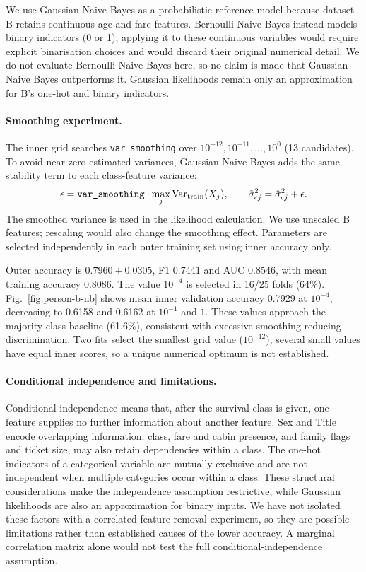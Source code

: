 \documentclass[10pt,twocolumn]{article}
\begin{document}
We use Gaussian Naive Bayes as a probabilistic reference model because dataset B retains continuous age and fare features.
Bernoulli Naive Bayes instead models binary indicators (0 or 1); applying it to these continuous variables would require explicit binarisation choices and would discard their original numerical detail.
We do not evaluate Bernoulli Naive Bayes here, so no claim is made that Gaussian Naive Bayes outperforms it.
Gaussian likelihoods remain only an approximation for B's one-hot and binary indicators.

\paragraph{Smoothing experiment.}
The inner grid searches \texttt{var\_smoothing} over $10^{-12},10^{-11},\ldots,10^0$ (13 candidates).
To avoid near-zero estimated variances, Gaussian Naive Bayes adds the same stability term to each class-feature variance:
\[
 \epsilon=\texttt{var\_smoothing}\cdot\max_j\operatorname{Var}_{\rm train}(X_j),
 \qquad \tilde\sigma_{cj}^{2}=\hat\sigma_{cj}^{2}+\epsilon.
\]
The smoothed variance is used in the likelihood calculation.
We use unscaled B features; rescaling would also change the smoothing effect.
Parameters are selected independently in each outer training set using inner accuracy only.

Outer accuracy is $0.7960\pm0.0305$, F1 0.7441 and AUC 0.8546, with mean training accuracy 0.8086.
The value $10^{-4}$ is selected in 16/25 folds (64\%).
Fig.~\ref{fig:person-b-nb} shows mean inner validation accuracy 0.7929 at $10^{-4}$, decreasing to 0.6158 and 0.6162 at $10^{-1}$ and $1$.
These values approach the majority-class baseline (61.6\%), consistent with excessive smoothing reducing discrimination.
Two fits select the smallest grid value ($10^{-12}$); several small values have equal inner scores, so a unique numerical optimum is not established.

\paragraph{Conditional independence and limitations.}
Conditional independence means that, after the survival class is given, one feature supplies no further information about another feature.
Sex and Title encode overlapping information; class, fare and cabin presence, and family flags and ticket size, may also retain dependencies within a class.
The one-hot indicators of a categorical variable are mutually exclusive and are not independent when multiple categories occur within a class.
These structural considerations make the independence assumption restrictive, while Gaussian likelihoods are also an approximation for binary inputs.
We have not isolated these factors with a correlated-feature-removal experiment, so they are possible limitations rather than established causes of the lower accuracy.
A marginal correlation matrix alone would not test the full conditional-independence assumption.
\end{document}
